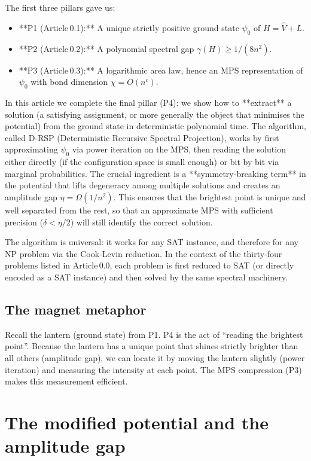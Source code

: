 \documentclass[11pt,a4paper]{article}
\begin{document}
The first three pillars gave us:
\begin{itemize}
\item **P1 (Article 0.1):** A unique strictly positive ground state \(\psi_0\) of \(H = \hat{V} + L\).
\item **P2 (Article 0.2):** A polynomial spectral gap \(\gamma(H) \ge 1/(8n^2)\).
\item **P3 (Article 0.3):** A logarithmic area law, hence an MPS representation of \(\psi_0\) with bond dimension \(\chi = O(n^c)\).
\end{itemize}
In this article we complete the final pillar (P4): we show how to **extract** a solution (a satisfying assignment, or more generally the object that minimises the potential) from the ground state in deterministic polynomial time. The algorithm, called D‑RSP (Deterministic Recursive Spectral Projection), works by first approximating \(\psi_0\) via power iteration on the MPS, then reading the solution either directly (if the configuration space is small enough) or bit by bit via marginal probabilities. The crucial ingredient is a **symmetry‑breaking term** in the potential that lifts degeneracy among multiple solutions and creates an amplitude gap \(\eta = \Omega(1/n^2)\). This ensures that the brightest point is unique and well separated from the rest, so that an approximate MPS with sufficient precision (\(\delta < \eta/2\)) will still identify the correct solution.

The algorithm is universal: it works for any SAT instance, and therefore for any NP problem via the Cook‑Levin reduction. In the context of the thirty‑four problems listed in Article 0.0, each problem is first reduced to SAT (or directly encoded as a SAT instance) and then solved by the same spectral machinery.

\subsection*{The magnet metaphor}

Recall the lantern (ground state) from P1. P4 is the act of “reading the brightest point”. Because the lantern has a unique point that shines strictly brighter than all others (amplitude gap), we can locate it by moving the lantern slightly (power iteration) and measuring the intensity at each point. The MPS compression (P3) makes this measurement efficient.

\section{The modified potential and the amplitude gap}
\end{document}
